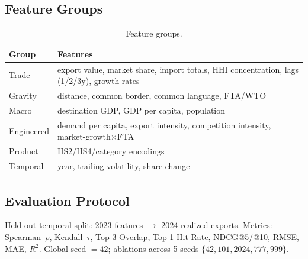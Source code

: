 \documentclass[conference]{IEEEtran}
\newcommand{\arrowto}{$\rightarrow$}
\begin{document}
\subsection{Feature Groups}
\begin{table}[h]
\centering
\caption{Feature groups.}
\label{tab:features}
\begin{tabular}{@{}p{1.7cm}p{6cm}@{}}
\toprule
\textbf{Group} & \textbf{Features} \\
\midrule
Trade      & export value, market share, import totals, HHI
             concentration, lags (1/2/3y), growth rates \\
Gravity    & distance, common border, common language, FTA/WTO \\
Macro      & destination GDP, GDP per capita, population \\
Engineered & demand per capita, export intensity, competition intensity,
             market-growth$\times$FTA \\
Product    & HS2/HS4/category encodings \\
Temporal   & year, trailing volatility, share change \\
\bottomrule
\end{tabular}
\end{table}

\subsection{Evaluation Protocol}
Held-out temporal split: 2023 features \arrowto{} 2024 realized exports.
Metrics: Spearman~$\rho$, Kendall~$\tau$, Top-3 Overlap, Top-1 Hit Rate,
NDCG@5/@10, RMSE, MAE, $R^2$. Global seed $=42$; ablations across 5 seeds
$\{42, 101, 2024, 777, 999\}$.
\end{document}
